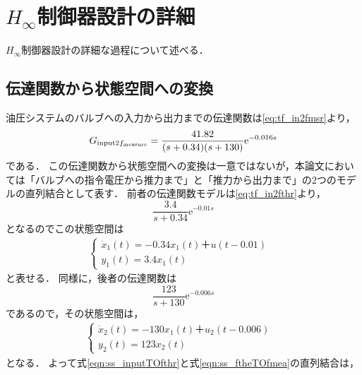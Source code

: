 \chapter{$H_\infty$制御器設計の詳細}
$H_\infty$制御器設計の詳細な過程について述べる．
\section{伝達関数から状態空間への変換}
\label{sec:tf2ss}
油圧システムのバルブへの入力から出力までの伝達関数は\eqnname\eqref{eq:tf_in2fmsr}より，
\begin{align}
    G_{\mathrm{input}2f_\mathrm{measure}} = \frac{41.82}{(s+0.34)(s+130)}\mathrm{e}^{-0.016s}
\end{align}
である．
この伝達関数から状態空間への変換は一意ではないが，本論文においては「バルブへの指令電圧から推力まで」と「推力から出力まで」の2つのモデルの直列結合として表す．
前者の伝達関数モデルは\eqnname\eqref{eq:tf_in2fthr}より，
\begin{equation}
	\frac{3.4}{s+0.34}\mathrm{e}^{-0.01s}
\end{equation}
となるのでこの状態空間は
\begin{align}
	\begin{cases}
		\dot{x}_1(t) = -0.34x_1(t)＋u(t-0.01) &\\
		y_1(t) = 3.4x_1(t)&
	\end{cases}
	\label{eqn:ss_inputTOfthr}
\end{align}
と表せる．
同様に，後者の伝達関数は
\begin{equation}
	\frac{123}{s+130}\mathrm{e}^{-0.006s}
\end{equation}
であるので，その状態空間は，
\begin{align}
	\begin{cases}
		\dot{x}_2(t) = -130x_1(t)＋u_2(t-0.006) &\\
		y_2(t) = 123x_2(t)&
	\end{cases}
	\label{eqn:ss_ftheTOfmea}
\end{align}
となる．
よって式\eqref{eqn:ss_inputTOfthr}と式\eqref{eqn:ss_ftheTOfmea}の直列結合は，
